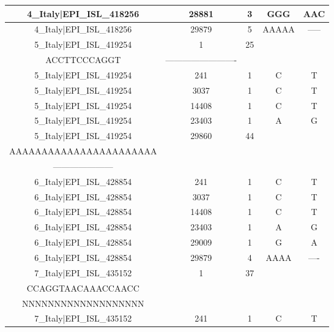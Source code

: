 \documentclass[a4paper,10pt]{article}
\begin{document}
\begin{longtable}{@{}ccccc@{}}
4\_Italy|EPI\_ISL\_418256 & 28881 & 3 & GGG & AAC \\* \midrule
4\_Italy|EPI\_ISL\_418256 & 29879 & 5 & AAAAA & ----- \\* \midrule
5\_Italy|EPI\_ISL\_419254 & 1 & 25 & \begin{tabular}[c]{@{}c@{}}ATTAAAGGTTTAT\\ ACCTTCCCAGGT\end{tabular} & ------------------------- \\* \midrule
5\_Italy|EPI\_ISL\_419254 & 241 & 1 & C & T \\* \midrule
5\_Italy|EPI\_ISL\_419254 & 3037 & 1 & C & T \\* \midrule
5\_Italy|EPI\_ISL\_419254 & 14408 & 1 & C & T \\* \midrule
5\_Italy|EPI\_ISL\_419254 & 23403 & 1 & A & G \\* \midrule
5\_Italy|EPI\_ISL\_419254 & 29860 & 44 & \begin{tabular}[c]{@{}c@{}}AGGAGAATGACAAAAAAAAAA\\ AAAAAAAAAAAAAAAAAAAAAAA\end{tabular} & \begin{tabular}[c]{@{}c@{}}-----------------------\\ ---------------------\end{tabular} \\* \midrule
6\_Italy|EPI\_ISL\_428854 & 241 & 1 & C & T \\* \midrule
6\_Italy|EPI\_ISL\_428854 & 3037 & 1 & C & T \\* \midrule
6\_Italy|EPI\_ISL\_428854 & 14408 & 1 & C & T \\* \midrule
6\_Italy|EPI\_ISL\_428854 & 23403 & 1 & A & G \\* \midrule
6\_Italy|EPI\_ISL\_428854 & 29009 & 1 & G & A \\* \midrule
6\_Italy|EPI\_ISL\_428854 & 29879 & 4 & AAAA & ---- \\* \midrule
7\_Italy|EPI\_ISL\_435152 & 1 & 37 & \begin{tabular}[c]{@{}c@{}}ATTAAAGGTTTATACCTTC\\ CCAGGTAACAAACCAACC\end{tabular} & \begin{tabular}[c]{@{}c@{}}NNNNNNNNNNNNNNNNNN\\ NNNNNNNNNNNNNNNNNNN\end{tabular} \\* \midrule
7\_Italy|EPI\_ISL\_435152 & 241 & 1 & C & T \\* \midrule

\end{longtable}
\end{document}
